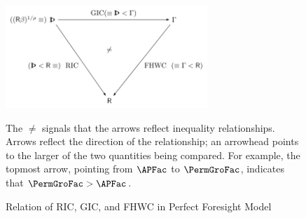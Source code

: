 \begin{figure}[ht]
  \label{fig:InequalityPFGICFHWCRIC}
  \centerline{
    \includegraphics[width=3in]{Figures/InequalityPFGICFHWCRIC}
  }
  \caption{Relation of {RIC}, {GIC}, and {FHWC} in Perfect Foresight Model}
  \footnotesize{The $\neq$ signals that the arrows reflect inequality relationships.  Arrows reflect the direction of the relationship; an arrowhead points to the larger of the two quantities being compared.  For example, the topmost arrow, pointing from $\APFac$ to $\PermGroFac$, indicates that $\PermGroFac > \APFac$.}
\end{figure}
